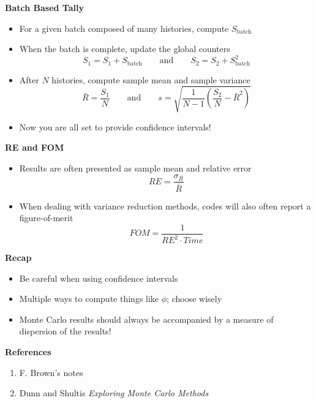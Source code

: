   
\textbf{Batch Based Tally}
  \begin{itemize}
   \item For a given batch composed of many histories, compute $S_{\text{batch}}$
   \item When the batch is complete, update the global counters
   \begin {equation*}
     S_{1} = S_{1} + S_{\text{batch}} \quad\quad \text{and} 
       \quad\quad S_{2} = S_{2} + S_{\text{batch}}^{2}
   \end {equation*}
   \item After $N$ histories, compute sample mean and sample variance
   \begin {equation*}
     \bar{R} = \frac{S_{1}}{N} \quad\quad \text{and}  
     \quad\quad 
     s = \sqrt{\frac{1}{N-1}\left(\frac{S_{2}}{N}-\bar{R}^{2}\right)}
   \end {equation*} 
    \item Now you are all set to provide confidence intervals!
  \end{itemize}
 
\textbf{RE and FOM}
  \begin{itemize}
    \item Results are often presented as sample mean and relative error
      \begin{equation*}
        RE = \frac{\sigma_{\bar{R}}}{\bar{R}}
       \end{equation*}
    \item When dealing with variance reduction methods, codes will 
          also often report a figure-of-merit
    \begin{equation*}
      FOM = \frac{1}{RE^{2}\cdot Time}
    \end{equation*}
  \end{itemize}
 
\textbf{Recap}
  \begin{itemize}
    \item Be careful when using confidence intervals
    \item Multiple ways to compute things like $\phi$; choose wisely
    \item Monte Carlo results should always be 
          accompanied by a measure of dispersion of the results!  
  \end{itemize}
 
\textbf{References}
 \begin{enumerate}
  \item F. Brown's notes
  \item Dunn and Shultis \emph{Exploring Monte Carlo Methods}
 \end{enumerate}